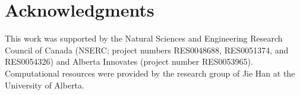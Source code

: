 \section{Acknowledgments}
This work was supported by the Natural Sciences and Engineering Research Council of Canada (NSERC; project numbers RES0048688, RES0051374, and RES0054326) and Alberta Innovates (project number RES0053965). Computational resources were provided by the research group of Jie Han at the University of Alberta.

